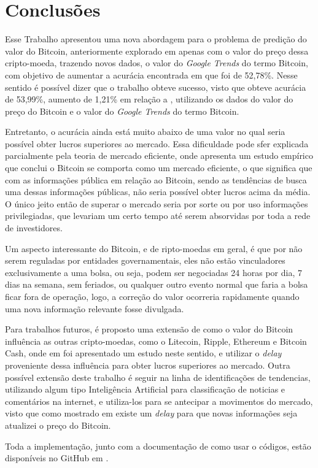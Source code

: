 \section{Conclusões}\label{conclusao}

Esse Trabalho apresentou uma nova abordagem para o problema de predição do valor do Bitcoin, anteriormente explorado em \cite{mcnally2016predicting} apenas com o valor do preço dessa cripto-moeda, trazendo novos dados, o valor do \textit{Google Trends} do termo Bitcoin, com objetivo de aumentar a acurácia encontrada em \cite{mcnally2016predicting} que foi de 52,78\%. Nesse sentido é possível dizer que o trabalho obteve sucesso, visto que obteve acurácia de 53,99\%, aumento de 1,21\% em relação a \cite{mcnally2016predicting}, utilizando os dados do valor do preço do Bitcoin e o valor do \textit{Google Trends} do termo Bitcoin.

Entretanto, o acurácia ainda está muito abaixo de uma valor no qual seria possível obter lucros superiores ao mercado. Essa dificuldade pode sfer explicada parcialmente pela teoria de mercado eficiente, onde \cite{bartos2015does} apresenta um estudo empírico que conclui o Bitcoin se comporta como um mercado eficiente, o que significa que com as informações pública em relação ao Bitcoin, sendo as tendências de busca uma dessas informações públicas, não seria possível obter lucros acima da média. O único jeito então de superar o mercado seria por sorte ou por uso informações privilegiadas, que levariam um certo tempo até serem absorvidas por toda a rede de investidores.

Um aspecto interessante do Bitcoin, e de ripto-moedas em geral, é que por não serem reguladas por entidades governamentais, eles não estão vinculadores exclusivamente a uma bolsa, ou seja, podem ser negociadas 24 horas por dia, 7 dias na semana, sem feriados, ou qualquer outro evento normal que faria a bolsa ficar fora de operação, logo, a correção do valor ocorreria  rapidamente quando uma nova informação relevante fosse divulgada.

Para trabalhos futuros, é proposto uma extensão de como o valor do Bitcoin influência as outras cripto-moedas, como o Litecoin, Ripple, Ethereum e Bitcoin Cash, onde em \cite{baccao2018information} foi apresentado um estudo neste sentido, e utilizar o \textit{delay} proveniente dessa influência para obter lucros superiores ao mercado. Outra possível extensão deste trabalho é seguir na linha de identificações de tendencias, utilizando algum tipo Inteligência Artificial para classificação de noticias e comentários na internet, e utiliza-los para se antecipar a movimentos do mercado, visto que como mostrado em \cite{bartos2015does} existe um \textit{delay} para que novas informações seja atualizei o preço do Bitcoin.

Toda a implementação, junto com a documentação de como usar o códigos, estão disponíveis no GitHub em \cite{repositorio}.